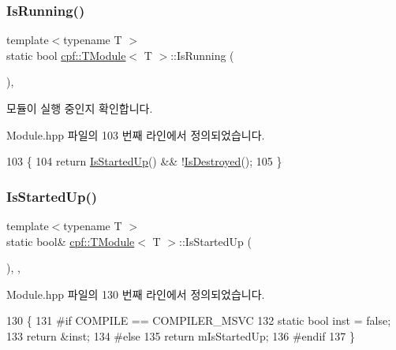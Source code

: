 \subsubsection{\texorpdfstring{Is\+Running()}{IsRunning()}}
{\footnotesize\ttfamily template$<$typename T $>$ \\
static bool \hyperlink{classcpf_1_1_t_module}{cpf\+::\+T\+Module}$<$ T $>$\+::Is\+Running (\begin{DoxyParamCaption}{ }\end{DoxyParamCaption})\hspace{0.3cm}{\ttfamily [inline]}, {\ttfamily [static]}}

모듈이 실행 중인지 확인합니다. 

Module.\+hpp 파일의 103 번째 라인에서 정의되었습니다.


\begin{DoxyCode}
103                                 \{
104             \textcolor{keywordflow}{return} \hyperlink{classcpf_1_1_t_module_a73732afee7131dad652bf3e00c75cef9}{IsStartedUp}() && !\hyperlink{classcpf_1_1_t_module_a9f70f0a70ac59b13b7a874f82c877337}{IsDestroyed}();
105         \}
\end{DoxyCode}
\mbox{\label{classcpf_1_1_t_module_a73732afee7131dad652bf3e00c75cef9}} 
\subsubsection{\texorpdfstring{Is\+Started\+Up()}{IsStartedUp()}}
{\footnotesize\ttfamily template$<$typename T $>$ \\
static bool\& \hyperlink{classcpf_1_1_t_module}{cpf\+::\+T\+Module}$<$ T $>$\+::Is\+Started\+Up (\begin{DoxyParamCaption}{ }\end{DoxyParamCaption})\hspace{0.3cm}{\ttfamily [inline]}, {\ttfamily [static]}, {\ttfamily [private]}}



Module.\+hpp 파일의 130 번째 라인에서 정의되었습니다.


\begin{DoxyCode}
130                                    \{
131 \textcolor{preprocessor}{#if COMPILE == COMPILER\_MSVC}
132             \textcolor{keyword}{static} \textcolor{keywordtype}{bool} inst = \textcolor{keyword}{false};
133             \textcolor{keywordflow}{return} &inst;
134 \textcolor{preprocessor}{#else}
135             \textcolor{keywordflow}{return} mIsStartedUp;
136 \textcolor{preprocessor}{#endif}
137         \}
\end{DoxyCode}
\mbox{\label{classcpf_1_1_t_module_a15c93b1aca54022e145961bea8e3ea7d}} 
